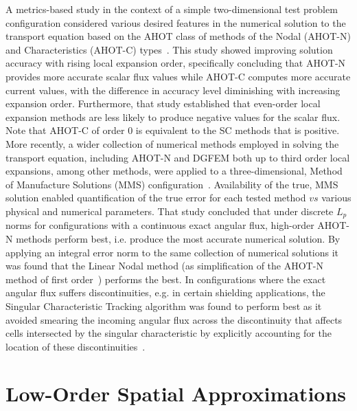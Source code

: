 A metrics-based study in the context of a simple two-dimensional test problem configuration considered various desired features in the numerical solution to the transport equation based on the \ac{AHOT} class of methods of the Nodal (\ac{AHOT-N}) and Characteristics (\ac{AHOT-C}) types~\cite{Azmy1992}.
This study showed improving solution accuracy with rising local expansion order, specifically concluding that \ac{AHOT-N} provides more accurate scalar flux values while \ac{AHOT-C} computes more accurate current values, with the difference in accuracy level diminishing with increasing expansion order.
Furthermore, that study established that even-order local expansion methods are less likely to produce negative values for the scalar flux.
Note that \ac{AHOT-C} of order 0 is equivalent to the \ac{SC} methods that is positive.
More recently, a wider collection of numerical methods employed in solving the transport equation, including \ac{AHOT-N} and \ac{DGFEM} both up to third order local expansions, among other methods, were applied to a three-dimensional, Method of Manufacture Solutions (MMS) configuration~\cite{Schunert2015}.
Availability of the true, MMS solution enabled quantification of the true error for each tested method $vs$ various physical and numerical parameters.
That study concluded that under discrete $L_p$ norms for configurations with a continuous exact angular flux, high-order \ac{AHOT-N} methods perform best, i.e. produce the most accurate numerical solution.
By applying an integral error norm to the same collection of numerical solutions it was found that the Linear Nodal method (as simplification of the \ac{AHOT-N} method of first order~\cite{Azmy1988}) performs the best.
In configurations where the exact angular flux suffers discontinuities, e.g. in certain shielding applications, the Singular Characteristic Tracking algorithm was found to perform best as it avoided smearing the incoming angular flux across the discontinuity that affects cells intersected by the singular characteristic by explicitly accounting for the location of these discontinuities~\cite{Duo2009}.

\section{Low-Order Spatial Approximations}

